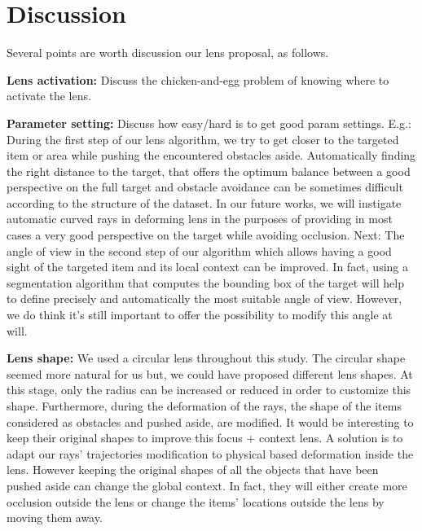 \section{Discussion}
\label{sec:discussion}
%
%
Several points are worth discussion our lens proposal, as follows.

\noindent\textbf{Lens activation:} Discuss the chicken-and-egg problem of knowing where to activate the lens.

\vspace{0.15cm}
\noindent\textbf{Parameter setting:} Discuss how easy/hard is to get good param settings. E.g.: During the first step of our lens algorithm, we try to get closer to the targeted item or area while pushing the encountered obstacles aside. Automatically finding the right distance to the target, that offers the optimum balance between a good perspective on the full target and obstacle avoidance can be sometimes difficult according to the structure of the dataset. In our future works, we will instigate automatic curved rays in deforming lens in the purposes of providing in most cases a very good perspective on the target while avoiding occlusion. Next: The angle of view in the second step of our algorithm which allows having a good sight of the targeted item and its local context can be improved. In fact, using a segmentation algorithm that computes the bounding box of the target will help to define precisely and automatically the most suitable angle of view. However, we do think it's still important to offer the possibility to modify this angle at will.

\vspace{0.15cm}
\noindent\textbf{Lens shape:} We used a circular lens throughout this study. The circular shape seemed more natural for us but, we could have proposed different lens shapes. At this stage, only the radius can be increased or reduced in order to customize this shape. Furthermore, during the deformation of the rays, the shape of the items considered as obstacles and pushed aside, are modified. It would be interesting to keep their original shapes to improve this focus + context lens. A solution is to adapt our rays' trajectories modification to physical based deformation inside the lens. However keeping the original shapes of all the objects that have been pushed aside can change the global context. In fact, they will either create more occlusion outside the lens or change the items' locations outside the lens by moving them away.

